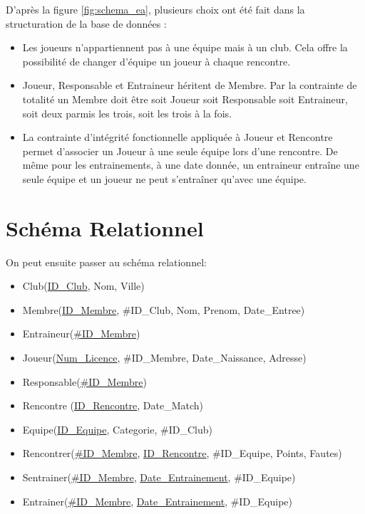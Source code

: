 \documentclass[a4paper»,8pt,french,fleqn]{report}
\begin{document}
D'après la figure \ref{fig:schema_ea}, plusieurs choix ont été fait dans la structuration de la base de données : \\

\begin{itemize}

\item Les joueurs n'appartiennent pas à une équipe mais à un club. Cela offre la possibilité de changer d'équipe un joueur à chaque rencontre. \\

\item Joueur, Responsable et Entraineur héritent de Membre. Par la contrainte de totalité un Membre doit être soit Joueur soit Responsable soit Entraineur, soit deux parmis les trois, soit les trois à la fois.\\

\item La contrainte d'intégrité fonctionnelle appliquée à Joueur et Rencontre permet d'associer un Joueur à une seule équipe lors d'une rencontre. De même pour les entrainements, à une date donnée, un entraineur entraîne une seule équipe et un joueur ne peut s'entraîner qu'avec une équipe.

\end{itemize}

\section{Schéma Relationnel}

On peut ensuite passer au schéma relationnel: \\

\begin{itemize}

\item Club(\underline{ID\_Club}, Nom, Ville)  
\item Membre(\underline{ID\_Membre}, \#ID\_Club, Nom, Prenom, Date\_Entree) 
\item Entraineur(\underline{\#ID\_Membre}) 
\item Joueur(\underline{Num\_Licence}, \#ID\_Membre, Date\_Naissance, Adresse) 
\item Responsable(\underline{\#ID\_Membre}) 
\item Rencontre (\underline{ID\_Rencontre}, Date\_Match) 
\item Equipe(\underline{ID\_Equipe}, Categorie, \#ID\_Club) 
\item Rencontrer(\underline{\#ID\_Membre}, \underline{ID\_Rencontre}, \#ID\_Equipe, Points, Fautes) 
\item Sentrainer(\underline{\#ID\_Membre}, \underline{Date\_Entrainement}, \#ID\_Equipe) 
\item Entrainer(\underline{\#ID\_Membre}, \underline{Date\_Entrainement}, \#ID\_Equipe) \\

\end{itemize}
\end{document}
